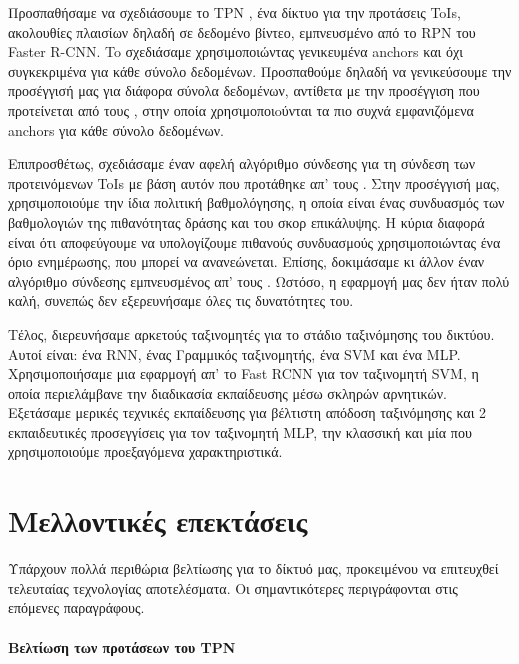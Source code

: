 Προσπαθήσαμε να σχεδιάσουμε   το \en TPN \gr, ένα δίκτυο  για την προτάσεις \en ToIs, \gr ακολουθίες πλαισίων δηλαδή 
σε δεδομένο βίντεο, εμπνευσμένο από το \en  RPN \gr  του \en Faster R-CNN\gr. To σχεδιάσαμε
χρησιμοποιώντας γενικευμένα \en anchors \gr  και όχι συγκεκριμένα για κάθε σύνολο δεδομένων. Προσπαθούμε δηλαδή
να γενικεύσουμε την προσέγγισή μας για διάφορα σύνολα δεδομένων, αντίθετα με την προσέγγιση
που προτείνεται από τους \en \cite{DBLP:journals/corr/abs-1712-09184}\gr, στην οποία χρησιμοποιoύνται τα πιο συχνά εμφανιζόμενα
\en anchors \gr για κάθε σύνολο δεδομένων.

Επιπροσθέτως, σχεδιάσαμε έναν αφελή αλγόριθμο σύνδεσης για τη σύνδεση
των προτεινόμενων \en ToIs \gr  με βάση αυτόν που προτάθηκε απ' τους \en \cite{DBLP:journals/corr/abs-1712-09184}\gr.
Στην προσέγγισή μας, χρησιμοποιούμε την ίδια πολιτική βαθμολόγησης, η οποία είναι ένας συνδυασμός των βαθμολογιών της πιθανότητας δράσης και του σκορ επικάλυψης.
Η κύρια διαφορά είναι ότι αποφεύγουμε να υπολογίζουμε
πιθανούς συνδυασμούς χρησιμοποιώντας ένα όριο ενημέρωσης, που μπορεί να ανανεώνεται. Επίσης, δοκιμάσαμε κι άλλον έναν
αλγόριθμο σύνδεσης εμπνευσμένος απ' τους \cite{DBLP:journals/corr/abs-1903-00304}.
Ωστόσο, η εφαρμογή μας δεν ήταν πολύ καλή, συνεπώς δεν εξερευνήσαμε όλες τις δυνατότητες του.

Τέλος, διερευνήσαμε αρκετούς ταξινομητές  για το στάδιο ταξινόμησης του
δικτύου. Αυτοί είναι: ένα \en RNN\gr, ένας Γραμμικός ταξινομητής, ένα \en SVM \gr  και ένα \en MLP\gr.
Χρησιμοποιήσαμε μια εφαρμογή απ' το  Fast RCNN για τον ταξινομητή  \en SVM\gr, η οποία περιελάμβανε την διαδικασία
εκπαίδευσης μέσω σκληρών αρνητικών. Εξετάσαμε μερικές τεχνικές εκπαίδευσης για
βέλτιστη απόδοση ταξινόμησης και 2 εκπαιδευτικές προσεγγίσεις για τον ταξινομητή \en MLP\gr, την κλασσική και μία που
χρησιμοποιούμε προεξαγόμενα χαρακτηριστικά.

\section{Μελλοντικές επεκτάσεις}

Υπάρχουν πολλά περιθώρια βελτίωσης για το δίκτυό μας, προκειμένου να επιτευχθεί
τελευταίας τεχνολογίας αποτελέσματα. Οι σημαντικότερες περιγράφονται στις επόμενες παραγράφους.

\paragraph{Βελτίωση των προτάσεων του \en TPN\gr}

